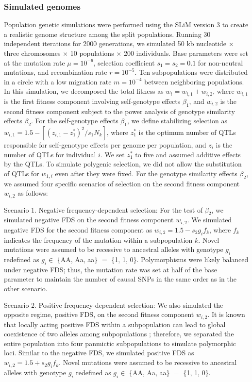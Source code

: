 \documentclass[12pt,]{article}
\begin{document}
\subsubsection{Simulated genomes}
Population genetic simulations were performed using the SLiM version 3 to create a realistic genome structure among the split populations. Running 30 independent iterations for 2000 generations, we simulated 50 kb nucleotide $\times$ three chromosomes $\times$ 10 populations $\times$ 200 individuals. Base parameters were set at the mutation rate $\mu = 10^{-6}$, selection coefficient $s_1=s_2=0.1$ for non-neutral mutations, and recombination rate $r=10^{-5}$. Ten subpopulations were distributed in a circle with a low migration rate $m=10^{-4}$ between neighboring populations. In this simulation, we decomposed the total fitness as $w_i = w_{i,1} + w_{i,2}$, where $w_{i,1}$ is the first fitness component involving self-genotype effects $\beta_1$, and $w_{i,2}$ is the second fitness component subject to the power analysis of genotype similarity effects $\beta_2$. For the self-genotype effects $\beta_1$, we define stabilizing selection as $w_{i,1} = 1.5 - [(z_{i,1} - z_1^*)^2 / s_1N_k]$, where $z_1^*$ is the optimum number of QTLs responsible for self-genotype effects per genome per population, and $z_i$ is the number of QTLs for individual $i$. We set $z_1^*$ to five and assumed additive effects by the QTLs. To simulate polygenic selection, we did not allow the substitution of QTLs for $w_{1,i}$ even after they were fixed. For the genotype similarity effects $\beta_2$, we assumed four specific scenarios of selection on the second fitness component $w_{i,2}$ as follows: 

Scenario 1. Negative frequency-dependent selection: For the test of $\beta_2$, we simulated negative FDS on the second fitness component $w_{i,2}$. We simulated negative FDS for the second fitness component as $w_{i,2} = 1.5 - s_ 2 g _if_k$, where $f_k$ indicates the frequency of the mutation within a subpopulation $k$. Novel mutations were assumed to be recessive to ancestral alleles with genotype $g_i$ redefined as $g_i \in$ \{AA, Aa, aa\} $=$ \{1, 1, 0\}. Polymorphisms were likely balanced under negative FDS; thus, the mutation rate was set at half of the base parameter to maintain the number of causal SNPs in the same order as in the other scenario.

Scenario 2. Positive frequency-dependent selection: We also simulated the opposite regime, positive FDS, on the second fitness component $w_{i,2}$. It is known that locally acting positive FDS within a subpopulation can lead to global coexistence of two alleles among subpopulations \citep{molofsky2001coexistence}; therefore, we separated the entire population into four panmictic subpopulations to simulate polymorphic loci. Similar to the negative FDS, we simulated positive FDS as $w_{i,2} = 1.5 + s_ 2 g _if_k$. Novel mutations were assumed to be recessive to ancestral alleles with genotype $g_i$ redefined as $g_i \in$ \{AA, Aa, aa\} $=$ \{1, 1, 0\}. 
\end{document}
